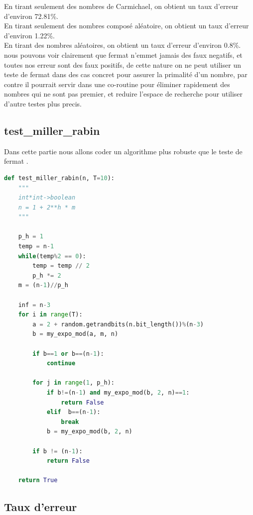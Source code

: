 \documentclass{article}
\begin{document}
En tirant seulement des nombres de Carmichael, on obtient un taux d'erreur d'environ 72.81\%.\\
En tirant seulement des nombres composé aléatoire, on obtient un taux d'erreur d'environ 1.22\%.\\
En tirant des nombres aléatoires, on obtient un taux d'erreur d'environ 0.8\%.\\

nous pouvons voir clairement que fermat n'emmet jamais des faux negatifs, et toutes nos erreur sont des faux positifs, de cette nature on ne peut utiliser un teste de fermat dans des cas concret pour assurer la primalité d'un nombre, par contre il pourrait servir dans une co-routine pour éliminer rapidement des nombres qui ne sont pas premier, et reduire l'espace de recherche pour utiliser d'autre testes plus precis.

\subsection{test\_miller\_rabin}

Dans cette partie nous allons coder un algorithme plus robuste que le teste de fermat .\\[1.5cm]


\begin{lstlisting}[language=Python, caption=Implementation test\_miller\_rabin]
def test_miller_rabin(n, T=10):
    """
    int*int->boolean
    n = 1 + 2**h * m
    """

    p_h = 1
    temp = n-1
    while(temp%2 == 0):
        temp = temp // 2
        p_h *= 2
    m = (n-1)//p_h

    inf = n-3
    for i in range(T):
        a = 2 + random.getrandbits(n.bit_length())%(n-3)
        b = my_expo_mod(a, m, n)

        if b==1 or b==(n-1):
            continue

        for j in range(1, p_h):
            if b!=(n-1) and my_expo_mod(b, 2, n)==1:
                return False
            elif  b==(n-1):
                break
            b = my_expo_mod(b, 2, n)
        
        if b != (n-1):
            return False
    
    return True
\end{lstlisting}

\subsection{Taux d'erreur}
\end{document}
